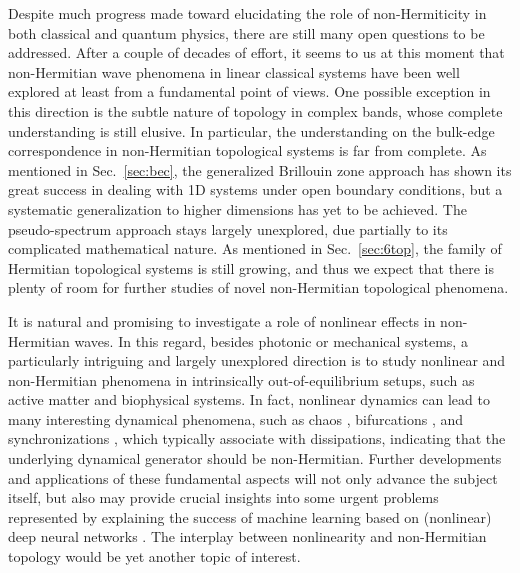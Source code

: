 \documentclass{tADP2e}
\theoremstyle{plain}
\theoremstyle{plain}
\theoremstyle{definition}
\begin{document}
Despite much progress made toward elucidating the role of non-Hermiticity in both classical and quantum physics, there are still many open questions to be addressed. 
After a couple of decades of effort, it seems to us at this moment that non-Hermitian wave phenomena in linear classical systems have been well explored at least from a fundamental point of views. One possible exception in this direction is the subtle nature of topology in complex bands, whose complete understanding is still elusive. In particular, the understanding on the bulk-edge correspondence in non-Hermitian topological systems is far from complete. As mentioned in Sec.~\ref{sec:bec}, the generalized Brillouin zone approach has shown its great success in dealing with 1D systems under open boundary conditions, but a systematic generalization to higher dimensions has yet to be achieved. The pseudo-spectrum approach stays largely unexplored, due partially to its complicated mathematical nature. As mentioned in Sec.~\ref{sec:6top}, the family of Hermitian topological systems is still growing, and thus we expect that there is plenty of room for further studies of novel non-Hermitian topological phenomena. 


It is natural and promising to investigate a role of nonlinear effects in non-Hermitian waves. In this regard, besides photonic or mechanical systems, a particularly intriguing and largely unexplored direction is to study nonlinear and non-Hermitian phenomena in intrinsically out-of-equilibrium setups, such as active matter and biophysical systems. In fact, nonlinear dynamics can lead to many interesting dynamical phenomena, such as chaos \cite{OE90}, bifurcations \cite{RMM76}, and synchronizations \cite{AJA05}, which typically associate with dissipations,  indicating that the underlying dynamical generator should be non-Hermitian. Further developments and applications of these fundamental aspects will not only advance the subject itself, but also may provide crucial insights into some urgent problems represented by explaining the success of machine learning based on (nonlinear) deep neural networks \cite{LZ20}. The interplay between nonlinearity and non-Hermitian topology would be yet another topic of interest.
\end{document}
